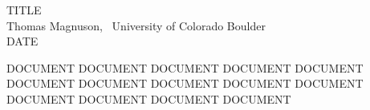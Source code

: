 \documentclass[12pt]{article}
\newcommand{\mytytle}[4]{
\begin{center}
	\LARGE{#1}\\[.25cm]
	\Large{#2,~ #3}\\
	\Large{#4}	
\end{center}
}
\begin{document}
	\thispagestyle{empty}
	\mytytle{TITLE}{Thomas Magnuson}{University of Colorado Boulder}{DATE}
 	\setlength{\parindent}{1.29cm}
DOCUMENT DOCUMENT DOCUMENT DOCUMENT DOCUMENT DOCUMENT DOCUMENT DOCUMENT DOCUMENT DOCUMENT DOCUMENT DOCUMENT DOCUMENT DOCUMENT
\end{document}
